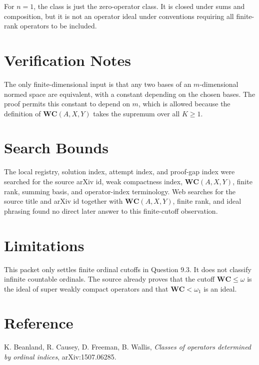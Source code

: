 \documentclass[11pt]{article}
\begin{document}
For $n=1$, the class is just the zero-operator class.  It is closed under sums
and composition, but it is not an operator ideal under conventions requiring
all finite-rank operators to be included.

\section*{Verification Notes}

The only finite-dimensional input is that any two bases of an
$m$-dimensional normed space are equivalent, with a constant depending on the
chosen bases.  The proof permits this constant to depend on $m$, which is
allowed because the definition of $\mathbf{WC}(A,X,Y)$ takes the supremum over
all $K\geq1$.

\section*{Search Bounds}

The local registry, solution index, attempt index, and proof-gap index were
searched for the source arXiv id, weak compactness index,
$\mathbf{WC}(A,X,Y)$, finite rank, summing basis, and operator-index
terminology.  Web searches for the source title and arXiv id together with
$\mathbf{WC}(A,X,Y)$, finite rank, and ideal phrasing found no direct later
answer to this finite-cutoff observation.

\section*{Limitations}

This packet only settles finite ordinal cutoffs in Question 9.3.  It does not
classify infinite countable ordinals.  The source already proves that the
cutoff $\mathbf{WC}\leq\omega$ is the ideal of super weakly compact operators
and that $\mathbf{WC}<\omega_1$ is an ideal.

\section*{Reference}

K. Beanland, R. Causey, D. Freeman, B. Wallis,
\emph{Classes of operators determined by ordinal indices}, arXiv:1507.06285.
\end{document}

